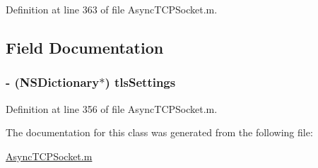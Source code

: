 Definition at line 363 of file AsyncTCPSocket.m.



\subsection{Field Documentation}
\hypertarget{interface_async_special_packet_a868321fcf00287d41712aec8a30616bf}{
\subsubsection[{tlsSettings}]{\setlength{\rightskip}{0pt plus 5cm}-\/ (NSDictionary$\ast$) {\bf tlsSettings}}}
\label{interface_async_special_packet_a868321fcf00287d41712aec8a30616bf}


Definition at line 356 of file AsyncTCPSocket.m.



The documentation for this class was generated from the following file:\begin{DoxyCompactItemize}
\item 
\hyperlink{_async_t_c_p_socket_8m}{AsyncTCPSocket.m}\end{DoxyCompactItemize}
